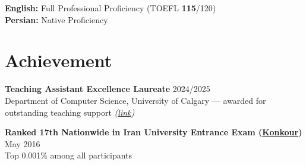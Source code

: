 \documentclass[a4paper,10pt]{article}
\begin{document}
\textbf{English:} Full Professional Proficiency (TOEFL \textbf{115}/120) \\
\textbf{Persian:} Native Proficiency

\section*{Achievement}

\textbf{Teaching Assistant Excellence Laureate} \hfill 2024/2025 \\
Department of Computer Science, University of Calgary --- awarded for outstanding teaching support \textit{(\href{https://science.ucalgary.ca/computer-science/about/our-department/ta-recognition-2024-2025}{link})}

\vspace{0.35em}

\textbf{Ranked 17th Nationwide in Iran University Entrance Exam (\href{https://en.wikipedia.org/wiki/Iranian_University_Entrance_Exam}{Konkour})} \hfill May 2016 \\
Top 0.001\% among all participants
\end{document}
